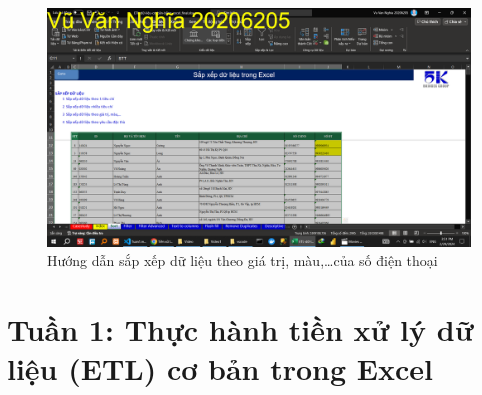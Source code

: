 \documentclass{article}
\begin{document}
\begin{figure}[H]
    \centering
    \includegraphics[scale = 0.15]{Video1/HuongDan/3.png}
    \caption{Hướng dẫn sắp xếp dữ liệu theo giá trị, màu,\dots của số điện thoại}
\end{figure}


\section{Tuần 1: Thực hành tiền xử lý dữ liệu (ETL) cơ bản trong Excel}





















\end{document}
